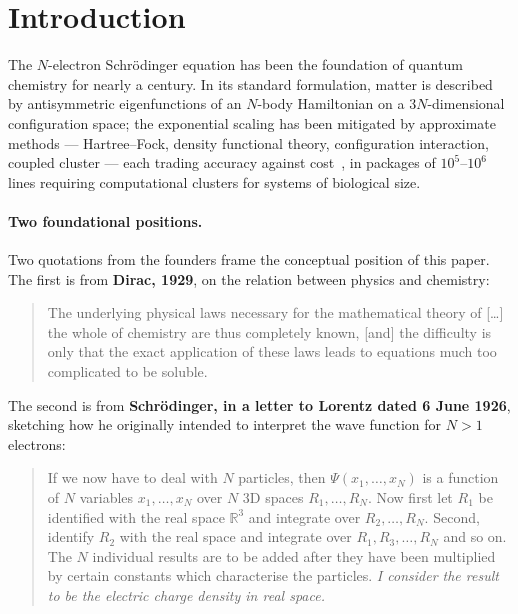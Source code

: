 \documentclass[11pt]{article}
\begin{document}
\section{Introduction}

The $N$-electron Schr\"odinger equation has been the foundation of quantum chemistry for nearly a century. In its standard formulation, matter is described by antisymmetric eigenfunctions of an $N$-body Hamiltonian on a $3N$-dimensional configuration space; the exponential scaling has been mitigated by approximate methods --- Hartree--Fock, density functional theory, configuration interaction, coupled cluster --- each trading accuracy against cost~\cite{HK64,KS65,MHG17}, in packages of $10^5$--$10^6$ lines requiring computational clusters for systems of biological size.

\paragraph{Two foundational positions.}
Two quotations from the founders frame the conceptual position of this paper. The first is from \textbf{Dirac, 1929}, on the relation between physics and chemistry:

\begin{quote}
The underlying physical laws necessary for the mathematical theory of [\ldots] the whole of chemistry are thus completely known, [and] the difficulty is only that the exact application of these laws leads to equations much too complicated to be soluble.
\end{quote}

The second is from \textbf{Schr\"odinger, in a letter to Lorentz dated 6 June 1926}, sketching how he originally intended to interpret the wave function for $N>1$ electrons:

\begin{quote}
If we now have to deal with $N$ particles, then $\Psi(x_1, \ldots, x_N)$ is a function of $N$ variables $x_1, \ldots, x_N$ over $N$ 3D spaces $R_1, \ldots, R_N$. Now first let $R_1$ be identified with the real space $\mathbb{R}^3$ and integrate over $R_2, \ldots, R_N$. Second, identify $R_2$ with the real space and integrate over $R_1, R_3, \ldots, R_N$ and so on. The $N$ individual results are to be added after they have been multiplied by certain constants which characterise the particles. \emph{I consider the result to be the electric charge density in real space.}
\end{quote}
\end{document}
